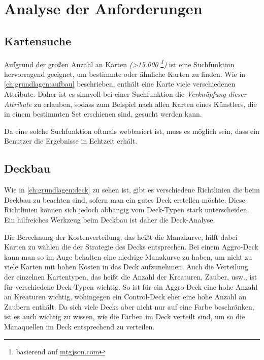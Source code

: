 \section{Analyse der Anforderungen}\label{ch:analyse}

\subsection{Kartensuche}
Aufgrund der großen Anzahl an Karten \emph{(>15.000 \footnote{basierend auf \url{mtgjson.com}})} ist eine Suchfunktion hervorragend geeignet, um bestimmte oder ähnliche Karten zu finden. Wie in \ref{ch:grundlagen:aufbau} beschrieben, enthält eine Karte viele verschiedenen Attribute. Daher ist es sinnvoll bei einer Suchfunktion die \emph{Verknüpfung dieser Attribute} zu erlauben, sodass zum Beispiel nach allen Karten eines Künstlers, die in einem bestimmten Set erschienen sind, gesucht werden kann. 

Da eine solche Suchfunktion oftmals webbasiert ist, muss es möglich sein, dass ein Benutzer die Ergebnisse in Echtzeit erhält.



\subsection{Deckbau}
Wie in \ref{ch:grundlagen:deck} zu sehen ist, gibt es verschiedene Richtlinien die beim Deckbau zu beachten sind, sofern man ein gutes Deck erstellen möchte. Diese Richtlinien können sich jedoch abhängig vom Deck-Typen stark unterscheiden. Ein hilfreiches Werkzeug beim Deckbau ist daher die Deck-Analyse.

Die Berechnung der Kostenverteilung, das heißt die Manakurve, hilft dabei Karten zu wählen die der Strategie des Decks entsprechen. Bei einem Aggro-Deck kann man so im Auge behalten eine niedrige Manakurve zu haben, um nicht zu viele Karten mit hohen Kosten in das Deck aufzunehmen.
Auch die Verteilung der einzelnen Kartentypen, das heißt die Anzahl der Kreaturen, Zauber, usw., ist für verschiedene Deck-Typen wichtig. So ist für ein Aggro-Deck eine hohe Anzahl an Kreaturen wichtig, wohingegen ein Control-Deck eher eine hohe Anzahl an Zaubern enthält. Da sich viele Decks aber nicht nur auf eine Farbe beschränken, ist es auch wichtig zu wissen, wie die Farben im Deck verteilt sind, um so die Manaquellen im Deck entsprechend zu verteilen. 

